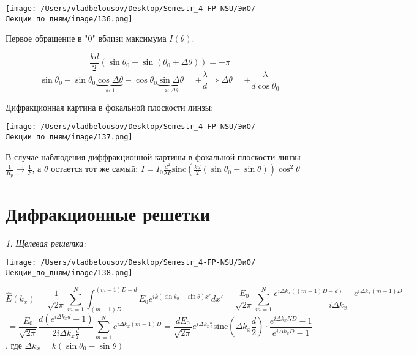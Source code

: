 \documentclass[12pt, a4paper]{report}
\begin{document}
\begin{center}
    \texttt{[image: /Users/vladbelousov/Desktop/Semestr\_4-FP-NSU/ЭиО/Лекции\_по\_дням/image/136.png]}
\end{center}

Первое обращение в "0" вблизи максимума  \( I(\theta) \). 

\[ \frac{kd }{2 } (\sin \theta_0 - \sin (\theta_0 + \Delta \theta)) = \pm  \pi  \] 
\[ \sin \theta_0 - \sin \theta_0 \underbrace{\cos \Delta \theta}_{\approx 1} - \cos  \theta_0 \underbrace{\sin  \Delta \theta}_{ \approx \Delta \theta} = \pm  \frac{\lambda}{d} \Rightarrow \Delta \theta = \pm  \frac{\lambda}{ d \cos \theta_0}   \] 

Дифракционная картина в фокальной плоскости линзы: 

\begin{center}
    \texttt{[image: /Users/vladbelousov/Desktop/Semestr\_4-FP-NSU/ЭиО/Лекции\_по\_дням/image/137.png]}
\end{center}

В случае наблюдения диффракционной картины в фокальной плоскости линзы \( \displaystyle  \frac{1}{R_p } \to  \frac{1}{F }   \), а \( \theta  \) остается тот же самый: \(\displaystyle  I = I_0 \frac{d ^2 }{\lambda F } \mathrm{ sinc }  \left( \frac{kd}{2 } (\sin \theta_0 - \sin \theta) \right) \cos  ^2 \theta   \) 

\section{Дифракционные решетки}

\textit{1. Щелевая решетка: } 

\begin{center}
    \texttt{[image: /Users/vladbelousov/Desktop/Semestr\_4-FP-NSU/ЭиО/Лекции\_по\_дням/image/138.png]}
\end{center} 

\[ \hat{ E } (k_x ) = \frac{1}{\sqrt{2 \pi }}  \sum_{m =1}^N\int_{(m -1 )D}^{(m-1)D +d} E_0 e^{ i k (\sin  \theta_0 - \sin  \theta) x' } dx' = \frac{E_0}{\sqrt{2 \pi}} \sum_{m =1}^{N }  \frac{e^{i \Delta k_x ((m -1 )D + d)} - e^{i \Delta k_x (m -1 )D } }{i \Delta k_x } =     \] 
\[ =\frac{E_0}{\sqrt{2 \pi }} \frac{d (e ^{i \Delta k_x d } -1 )}{ 2 i \Delta k_x \frac{d}{2 }  } \sum_{m =1}^{N }  e^{ i \Delta k_x (m-1 )D } = \frac{d E_0}{\sqrt{2 \pi }}  e^{ i \Delta k_x \frac{d}{2} } \mathrm{sinc } \left( \Delta k_x \frac{d}{2}  \right)   \cdot\frac{e^{ i \Delta k_x N D} -1 }{e^{ i \Delta k_x  D  } -1 }   \] 
, где \( \Delta k_x  = k (\sin \theta_0 - \sin \theta) \) 
\end{document}
